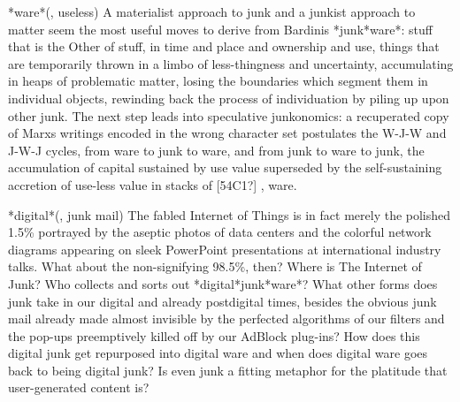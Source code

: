 *ware*\newline
[65E0?][7528?][7684?] (, useless)\newline
A materialist approach to junk and a junkist approach to matter seem the
most useful moves to derive from Bardini{\textquotesingle}s
 *junk*ware*: stuff that is the Other of
stuff, in time and place and ownership and use, things that are
temporarily thrown in a limbo of less-thingness and uncertainty,
accumulating in heaps of problematic matter, losing the boundaries
which segment them in individual objects, rewinding back the process of
individuation by piling up upon other junk. The next step leads into
speculative junkonomics: a recuperated copy of Marx{\textquotesingle}s
writings encoded in the wrong character set postulates the W-J-W and
J-W-J cycles, from ware to junk to ware, and from junk to ware to junk,
the accumulation of capital sustained by use value superseded by the
self-sustaining accretion of use-less value in stacks of [54C1?]
, {\textquotesingle}ware{\textquotesingle}.

*digital*\newline
[5783?][573E?][90AE?][4EF6?] (, junk
mail)\newline
The fabled Internet of Things is in fact merely the polished 1.5\%
portrayed by the aseptic photos of data centers and the colorful
network diagrams appearing on sleek PowerPoint presentations at
international industry talks. What about the non-signifying 98.5\%,
then? Where is The Internet of Junk? Who collects and sorts out
*digital*junk*ware*? What other forms does junk take in our digital and
already postdigital times, besides the obvious junk mail already made
almost invisible by the perfected algorithms of our filters and the
pop-ups preemptively killed off by our AdBlock plug-ins? How does this
digital junk get repurposed into digital ware and when does digital
ware goes back to being digital junk? Is even junk a fitting metaphor
for the platitude that user-generated content is?

